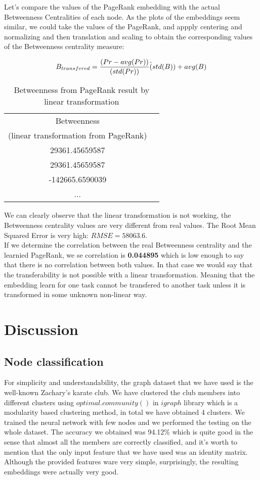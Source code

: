\documentclass[a4paper]{article}
\begin{document}
Let's compare the values of the PageRank embedding with the actual Betweenness Centralities of each node. As the plots of the embeddings seem similar, we could take the values of the PageRank, and appply centering and normalizing and then translation and scaling to obtain the corresponding values of the Betweenness centrality measure:

$$ B_{transfered} = { {(Pr - avg(Pr))} \over {(std(Pr))} } \dot (std(B)) + avg(B) $$

\begin{table}[H]
\centering
\begin{tabular}{cc}
  \hline
  Betweenness \\
 
 (linear transformation from PageRank) \\
  \hline
  29361.45659587 \\  
  29361.45659587 \\  
  -142665.6590039 \\
  ... \\
  \hline
   
\end{tabular}\caption{Betweenness from PageRank result by linear transformation}\label{tab:results_prev}
\end{table}

We can clearly observe that the linear transformation is not working, the Betweenness centrality values are very different from real values. The Root Mean Squared Error is very high: $ RMSE = 58063.6 $. \\
If we determine the correlation between the real Betweenness centrality and the learnied PageRank, we se correlation is \textbf{0.044895} which is low enough to say that there is no correlation between both values.
In that case we would say that the transferability is not possible with a linear transformation. Meaning that the embedding learn for one task cannot be transfered to another task unless it is transformed in some unknown non-linear way.




\section{Discussion} \label{disc}


\subsection{Node classification}
For simplicity and understandability, the graph dataset that we have used is the well-known Zachary's karate club. We have clustered the club members into different clusters using $optimal.community()$ in $igraph$ library which is a modularity based clustering method, in total we have obtained 4 clusters. We trained the neural network with few nodes and we performed the testing on the whole dataset. The accuracy we obtained was 94.12\% which is quite good in the sense that almost all the members are correctly classified, and it's worth to mention that the only input feature that we have used was an identity matrix. Although the provided features ware very simple, surprisingly, the resulting embeddings were actually very good. 
\end{document}
